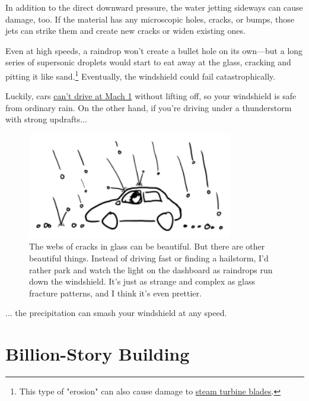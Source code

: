 {{In addition to the direct downward pressure, the water jetting sideways can cause damage, too. If the material has any microscopic holes, cracks, or bumps, those jets can strike them and create new cracks or widen existing ones.}

{Even at high speeds, a raindrop won't create a bullet hole on its own—but a long series of supersonic droplets would start to eat away at the glass, cracking and pitting it like sand.{\footnote{This type of "erosion" can also cause damage to \href{http://www.technicaljournalsonline.com/ijeat/VOL\%20II/IJAET\%20VOL\%20II\%20ISSUE\%20II\%20APRIL\%20JUNE\%202011/ARTICLE\%2014\%20IJAET\%20VOLII\%20ISSUE\%20II\%20APRIL-\%20JUNE\%202011.pdf}{steam turbine blades}.} } Eventually, the windshield could fail catastrophically.}

{Luckily, cars \href{http://what-if.xkcd.com/61/}{can't drive at Mach 1} without lifting off, so your windshield is safe from ordinary rain. On the other hand, if you're driving under a thunderstorm with strong updrafts...}

\begin{figure}[!htbp]
\centering
\includegraphics[scale=0.5, max width=0.8\textwidth]{imgs/a/93/rain_hail.png}
\caption{The webs of cracks in glass can be beautiful. But there are other beautiful things. Instead of driving fast or finding a hailstorm, I'd rather park and watch the light on the dashboard as raindrops run down the windshield. It's just as strange and complex as glass fracture patterns, and I think it's even prettier.}
\end{figure}

{... the precipitation can smash your windshield at any speed.}

{
\chapter{Billion-Story Building}
}

}
